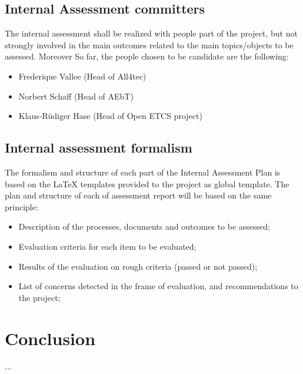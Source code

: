 \documentclass{template/openetcs_article}
\begin{document}
\subsection{Internal Assessment committers}
The internal assessment shall be realized with people part of the project, but not strongly involved in the main outcomes related to the main topics/objects to be assessed. Moreover
So far, the people chosen to be candidate are the following:
\begin{itemize}
\item Frederique Vallee (Head of All4tec)
\item Norbert Schaff (Head of AEbT)
\item Klaus-Rüdiger Hase (Head of Open ETCS project)
\end{itemize}

\subsection{Internal assessment formalism}
The formalism and structure of each part of the Internal Assessment Plan is based on the LaTeX templates provided to the project as global template.
The plan and structure of each of assessment report will be based on the same principle:
 \begin{itemize}
\item Description of the processes, documents and outcomes to be assessed;
\item Evaluation criteria for each item to be evaluated;
\item Results of the evaluation on rough criteria (passed or not passed);
\item List of concerns detected in the frame of evaluation, and recommendations to the project;
\end{itemize}

\section{Conclusion}
...



\end{document}
